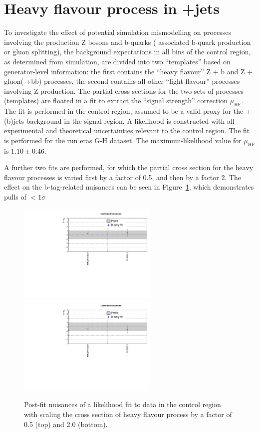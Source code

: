 
\section{Heavy flavour process in \texorpdfstring{\znunu}{Zinv}+jets}
\label{sec:zplusbb_app}

To investigate the effect of potential simulation mismodelling on
processes involving the production Z bosons and b-quarks (\ie
associated b-quark production or gluon splitting), the background
expectations in all bins of the \mmj control region, as determined
from simulation, are divided into two ``templates'' based on
generator-level information: the first contains the ``heavy flavour''
Z + b and Z + gluon($\rightarrow$bb) processes, the second contains
all other ``light flavour'' processes involving Z production. The
partial cross sections for the two sets of processes (templates) are
floated in a fit to extract the ``signal strength'' correction
$\mu_\mathrm{HF}$. The fit is performed in the \mmj control region,
assumed to be a valid proxy for the \znunu + (b)jets background in the
signal region. A likelihood is constructed with all experimental and 
theoretical uncertainties relevant to the \mmj control region. The fit
is performed for the run eras G-H dataset. The maximum-likelihood
value for $\mu_\mathrm{HF}$ is $1.10 \pm 0.46$.

A further two fits are performed, for which the partial cross section
for the heavy flavour processes is varied first by a factor of 0.5,
and then by a factor 2. The effect on the b-tag-related nuisances can
be seen in Figure~\ref{fig:zplusbb}, which demonstrates pulls of
$<1\sigma$

\begin{figure}[h!]
  \centering
  \includegraphics[width=0.6\textwidth]{figures/ZPlusbb/TemplateFitv1_HFXs0p5}
  \includegraphics[width=0.6\textwidth]{figures/ZPlusbb/TemplateFitv1_HFXs2p0}
  \caption{\label{fig:btagsfge1b} Post-fit nuisances of a likelihood
    fit to data in the \mmj control region with scaling the cross section of heavy 
    flavour process by a factor of 0.5 (top) and 2.0 (bottom). }
  \label{fig:zplusbb}
\end{figure}

